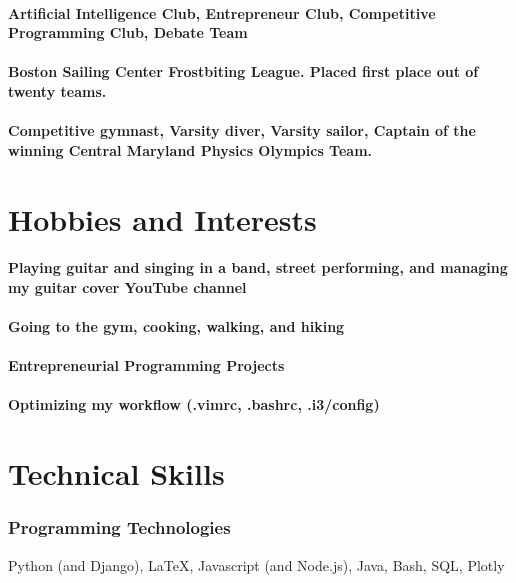 \documentclass{article}
\begin{document}
\paragraph{Artificial Intelligence Club, Entrepreneur Club, Competitive Programming Club, Debate Team}
\paragraph{Boston Sailing Center Frostbiting League. Placed first place out of twenty teams.}
\paragraph{Competitive gymnast, Varsity diver, Varsity sailor, Captain of the winning Central Maryland Physics Olympics Team.}

\section{Hobbies and Interests}

\paragraph{Playing guitar and singing in a band, street performing, and managing my guitar cover YouTube channel}

\paragraph{Going to the gym, cooking, walking, and hiking}

\paragraph{Entrepreneurial Programming Projects}

\paragraph{Optimizing my workflow (.vimrc, .bashrc, .i3/config)}


\section{Technical Skills}

\subsubsection{Programming Technologies}
\hfill Python (and Django), \LaTeX, Javascript (and Node.js), Java, Bash, SQL, Plotly

\end{document}
